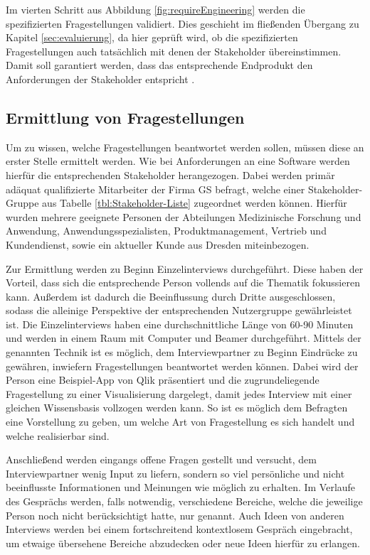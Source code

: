 Im vierten Schritt aus Abbildung \ref{fig:requireEngineering} werden die spezifizierten Fragestellungen validiert.
Dies geschieht im fließenden Übergang zu Kapitel \ref{sec:evaluierung}, da hier geprüft wird, ob die spezifizierten Fragestellungen auch tatsächlich mit denen der Stakeholder übereinstimmen.
Damit soll garantiert werden, dass das entsprechende Endprodukt den Anforderungen der Stakeholder entspricht \cite{Patig.}.


\subsection{Ermittlung von Fragestellungen}
Um zu wissen, welche Fragestellungen beantwortet werden sollen, müssen diese an erster Stelle ermittelt werden.
Wie bei Anforderungen an eine Software werden hierfür die entsprechenden Stakeholder herangezogen.
Dabei werden primär adäquat qualifizierte Mitarbeiter der Firma \gls{GS} befragt, welche einer Stakeholder-Gruppe aus Tabelle \ref{tbl:Stakeholder-Liste} zugeordnet werden können.
Hierfür wurden mehrere geeignete Personen der Abteilungen \glqq Medizinische Forschung und Anwendung\grqq, Anwendungsspezialisten, Produktmanagement, Vertrieb und Kundendienst, sowie ein aktueller Kunde aus Dresden miteinbezogen. %

Zur Ermittlung werden zu Beginn Einzelinterviews durchgeführt. 
Diese haben der Vorteil, dass sich die entsprechende Person vollends auf die Thematik fokussieren kann.
Außerdem ist dadurch die Beeinflussung durch Dritte ausgeschlossen, sodass die alleinige Perspektive der entsprechenden Nutzergruppe gewährleistet ist.
Die Einzelinterviews haben eine durchschnittliche Länge von 60-90 Minuten und werden in einem Raum mit Computer und Beamer durchgeführt.
Mittels der genannten Technik ist es möglich, dem Interviewpartner zu Beginn Eindrücke zu gewähren, inwiefern Fragestellungen beantwortet werden können.
Dabei wird der Person eine Beispiel-App von Qlik präsentiert und die zugrundeliegende Fragestellung zu einer Visualisierung dargelegt, damit jedes Interview mit einer gleichen Wissensbasis vollzogen werden kann.
So ist es möglich dem Befragten eine Vorstellung zu geben, um welche Art von Fragestellung es sich handelt und welche realisierbar sind.

Anschließend werden eingangs offene Fragen gestellt und versucht, dem Interviewpartner wenig Input zu liefern, sondern so viel persönliche und nicht beeinflusste Informationen und Meinungen wie möglich zu erhalten.
Im Verlaufe des Gesprächs werden, falls notwendig, verschiedene Bereiche, welche die jeweilige Person noch nicht berücksichtigt hatte, nur genannt.
Auch Ideen von anderen Interviews werden bei einem fortschreitend kontextlosem Gespräch eingebracht, um etwaige übersehene Bereiche abzudecken oder neue Ideen hierfür zu erlangen. 

